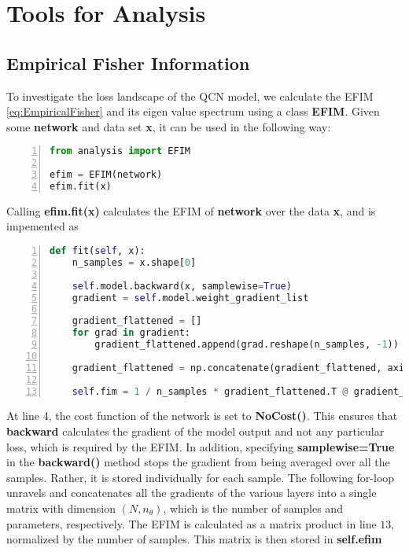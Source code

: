 \section{Tools for Analysis}\label{sec:Tools for Analysis Imp}

\subsection{Empirical Fisher Information}\label{sec:FIMImplement}
To investigate the loss landscape of the QCN model, we calculate the EFIM \autoref{eq:EmpiricalFisher} and its eigen value spectrum using a class \textbf{EFIM}. Given some \textbf{network} and data set \textbf{x}, it can be used in the following way:
\begin{lstlisting}[language=python, numbers=left]
from analysis import EFIM

efim = EFIM(network)
efim.fit(x)
\end{lstlisting}
Calling \textbf{efim.fit(x)} calculates the EFIM of \textbf{network} over the data \textbf{x}, and is impemented as
\begin{lstlisting}[language=python, numbers=left]
def fit(self, x):
    n_samples = x.shape[0]

    self.model.backward(x, samplewise=True)
    gradient = self.model.weight_gradient_list

    gradient_flattened = []
    for grad in gradient:
        gradient_flattened.append(grad.reshape(n_samples, -1))

    gradient_flattened = np.concatenate(gradient_flattened, axis=1)

    self.fim = 1 / n_samples * gradient_flattened.T @ gradient_flattened
\end{lstlisting}
At line 4, the cost function of the network is set to \textbf{NoCost()}. This ensures that \textbf{backward} calculates the gradient of the model output and not any particular loss, which is required by the EFIM. In addition, specifying \textbf{samplewise=True} in the \textbf{backward()} method stops the gradient from being averaged over all the samples. Rather, it is stored individually for each sample. The following for-loop unravels and concatenates all the gradients of the various layers into a single matrix with dimension $(N, n_{\theta})$, which is the number of samples and parameters, respectively. The EFIM is calculated as a matrix product in line $13$, normalized by the number of samples. This matrix is then stored in \textbf{self.efim}

